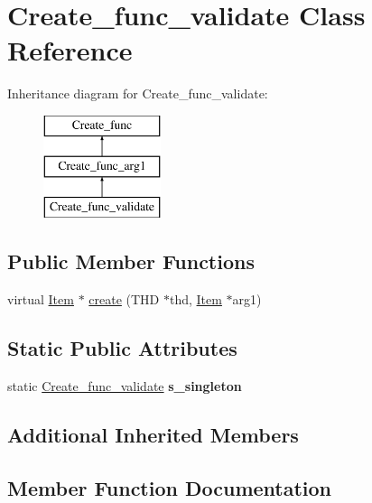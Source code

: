 \hypertarget{classCreate__func__validate}{}\section{Create\+\_\+func\+\_\+validate Class Reference}
\label{classCreate__func__validate}
Inheritance diagram for Create\+\_\+func\+\_\+validate\+:\begin{figure}[H]
\begin{center}
\leavevmode
\includegraphics[height=3.000000cm]{classCreate__func__validate}
\end{center}
\end{figure}
\subsection*{Public Member Functions}
\begin{DoxyCompactItemize}
\item 
virtual \mbox{\hyperlink{classItem}{Item}} $\ast$ \mbox{\hyperlink{classCreate__func__validate_a433de2c4db6717b0833848fd98747870}{create}} (T\+HD $\ast$thd, \mbox{\hyperlink{classItem}{Item}} $\ast$arg1)
\end{DoxyCompactItemize}
\subsection*{Static Public Attributes}
\begin{DoxyCompactItemize}
\item 
\mbox{\label{classCreate__func__validate_aee3e9f262bc0f633a5409f52f6c0b3d8}} 
static \mbox{\hyperlink{classCreate__func__validate}{Create\+\_\+func\+\_\+validate}} {\bfseries s\+\_\+singleton}
\end{DoxyCompactItemize}
\subsection*{Additional Inherited Members}


\subsection{Member Function Documentation}
\mbox{\label{classCreate__func__validate_a433de2c4db6717b0833848fd98747870}} 
